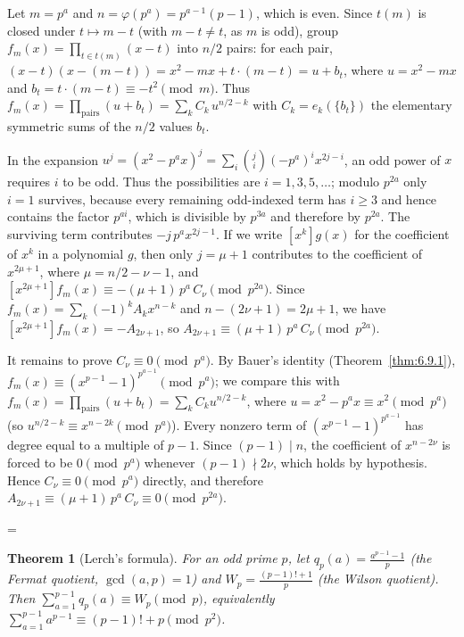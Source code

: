 \documentclass[11pt]{article}
\makeatletter
\theoremstyle{ntstyle}
\newtheorem{theorem}{Theorem}[subsection]
\let\nt@closedisplay\]
\def\nt@guardedclose{\@ifnextchar\par{\nt@closeafterpar}{\@ifnextchar\end{\postdisplaypenalty\@M\nt@closedisplay}{\nt@closedisplay}}}
\def\nt@closeafterpar\par{\@ifnextchar\par{\nt@closeafterpar}{\@ifnextchar\end{\postdisplaypenalty\@M\nt@closedisplay\par}{\nt@closedisplay\par}}}
\renewenvironment{proof}[1][\proofname]{\par
  \pushQED{\qed}\normalfont\topsep\medskipamount\edef\nt@afterproof{\@endparpenalty=\the\@endparpenalty\relax}\@beginparpenalty\@M\@endparpenalty\@M\let\]\nt@guardedclose\trivlist\item[]\textit{#1\@addpunct{.}} \ignorespaces}{\ifvmode\addpenalty\@M\fi\popQED\nt@afterproof\endtrivlist\@endpefalse}
\makeatother
\begin{document}
\begin{proof} Let $m = p^{a}$ and $n = \varphi(p^{a}) =
		p^{a-1}(p-1)$, which is even. Since $t(m)$ is closed under $t \mapsto
		m - t$ (with $m - t \neq t$, as $m$ is odd), group $f_m(x) = \prod_{t \in
			t(m)}(x-t)$ into $n/2$ pairs: for each pair, $(x-t)(x-(m-t)) = x^{2}
		- m x + t\cdot(m-t) = u + b_t$, where $u = x^{2} - m x$ and $b_t = t\cdot(m-t)
		\equiv -t^{2} \pmod{m}$. Thus $f_m(x) = \prod_{\text{pairs}}(u + b_t)
		= \sum_{k} C_k\, u^{n/2 - k}$ with $C_k = e_k(\{b_t\})$ the
	elementary symmetric sums of the $n/2$ values $b_t$.

	In the expansion $u^{j} = (x^{2} - p^{a} x)^{j} = \sum_{i}
		\binom{j}{i}(-p^{a})^{i} x^{2j - i}$, an odd power of $x$ requires $i$ to be odd. Thus the possibilities are $i=1,3,5,\ldots$; modulo $p^{2a}$ only $i=1$ survives, because every remaining odd-indexed term has $i\ge3$ and hence contains the factor $p^{ai}$, which is divisible by $p^{3a}$ and therefore by $p^{2a}$. The surviving term contributes $-j\,p^{a} x^{2j-1}$. If we write
	$[x^{k}] g(x)$ for the coefficient of $x^{k}$ in a polynomial $g$, then only
	$j = \mu+1$ contributes to the coefficient of $x^{2\mu+1}$, where $\mu = n/2 - \nu - 1$, and $[x^{2\mu+1}] f_m(x) \equiv -(\mu+1)\,p^{a}\, C_{\nu}
		\pmod{p^{2a}}$. Since $f_m(x) = \sum_k (-1)^{k} A_k x^{n-k}$ and $n -
		(2\nu+1) = 2\mu+1$, we have $[x^{2\mu+1}] f_m(x) = -A_{2\nu+1}$, so
	$A_{2\nu+1} \equiv (\mu+1)\,p^{a}\, C_{\nu} \pmod{p^{2a}}$.

	It remains to prove $C_{\nu} \equiv 0 \pmod{p^{a}}$. By Bauer's identity
	(Theorem~\ref{thm:6.9.1}), $f_m(x) \equiv (x^{p-1}-1)^{p^{a-1}} \pmod{p^{a}}$;
	we compare this with $f_m(x) = \prod_{\text{pairs}}(u+b_t) = \sum_k C_k
		u^{n/2-k}$, where $u = x^2 - p^a x \equiv x^2 \pmod{p^a}$ (so
	$u^{n/2-k} \equiv x^{n-2k} \pmod{p^a}$). Every nonzero term of
	$(x^{p-1}-1)^{p^{a-1}}$ has degree equal to a multiple of $p-1$. Since
	$(p-1)\mid n$, the coefficient of $x^{n-2\nu}$ is forced to be $0
		\pmod{p^a}$ whenever $(p-1) \nmid 2\nu$, which holds by hypothesis.
	Hence $C_{\nu} \equiv 0 \pmod{p^{a}}$ directly, and therefore
	$A_{2\nu+1} \equiv (\mu+1)\,p^{a}\,C_{\nu} \equiv 0 \pmod{p^{2a}}$.

\end{proof}
\begin{theorem}[Lerch's formula]\label{thm:6.9.3} For an odd prime
	$p$, let $q_p(a) = \tfrac{a^{p-1}-1}{p}$ (the Fermat quotient,
	$\gcd(a, p)=1$) and $W_p = \tfrac{(p-1)!+1}{p}$ (the Wilson quotient).
	Then $\sum_{a=1}^{p-1} q_p(a) \equiv W_p \pmod{p}$, equivalently
	$\sum_{a=1}^{p-1} a^{p-1} \equiv (p-1)! + p \pmod{p^{2}}$.

\end{theorem}
\end{document}
